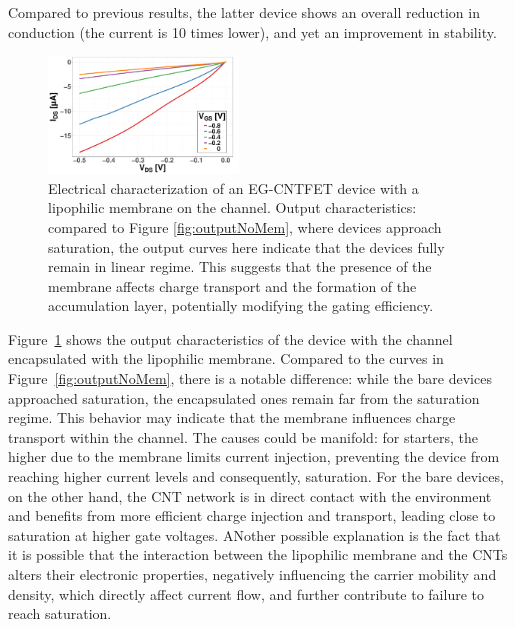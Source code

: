 Compared to previous results, the latter device shows an overall reduction in conduction (the current is 10 times lower), and yet an improvement in stability.

\begin{figure}
    \centering
    \includegraphics[width=0.45\textwidth]{figures/chapter3/EGFET/outputMem.pdf}
    \caption{Electrical characterization of an EG-CNTFET device with a lipophilic membrane on the channel. Output characteristics: compared to Figure \ref{fig:outputNoMem}, where devices approach saturation, the output curves here indicate that the devices fully remain in linear regime. This suggests that the presence of the membrane affects charge transport and the formation of the accumulation layer, potentially modifying the gating efficiency.}
    \label{fig:outputMem}
\end{figure}

Figure~\ref{fig:outputMem} shows the output characteristics of the device with the channel encapsulated with the lipophilic membrane. Compared to the curves in Figure~\ref{fig:outputNoMem}, there is a notable difference: while the bare devices approached saturation, the encapsulated ones remain far from the saturation regime. This behavior may indicate that the membrane influences charge transport within the channel. The causes could be manifold: for starters, the higher \rds{} due to the membrane limits current injection,  preventing the device from reaching higher current levels and consequently, saturation. For the bare devices, on the other hand, the CNT network is in direct contact with the environment and benefits from more efficient charge injection and transport, leading close to saturation at higher gate voltages. ANother possible explanation is the fact that it is possible that the interaction between the lipophilic membrane and the CNTs alters their electronic properties, negatively influencing the carrier mobility and density, which directly affect current flow, and further contribute to failure to reach saturation.

